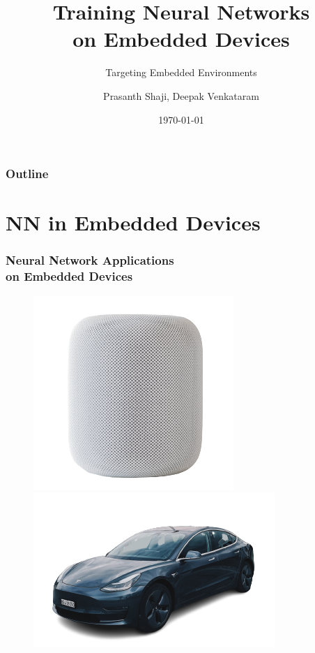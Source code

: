\documentclass{beamer}
\title
{Training Neural Networks \\ on Embedded Devices}
\subtitle{Targeting Embedded Environments}
\author[Prasanth Shaji, Deepak Venkataram]
{Prasanth Shaji, Deepak Venkataram}
\institute[Dept. of Information Technology]
{
  Master's Thesis \\
  Uppsala University
}
\date[HDR-NN]
{\today}
\begin{document}
\begin{frame}[plain]
  \titlepage
\end{frame}

\begin{frame}
    \frametitle{Outline}
    \tableofcontents
\end{frame}

\section{NN in Embedded Devices}

\begin{frame}
  \frametitle{Neural Network Applications \\ on Embedded Devices}

  \begin{figure}
    \centering
    \includegraphics[scale=0.42]{images/smart-speaker}
    \includegraphics[scale=0.42]{images/tesla}
  \end{figure}

\end{frame}
\end{document}
